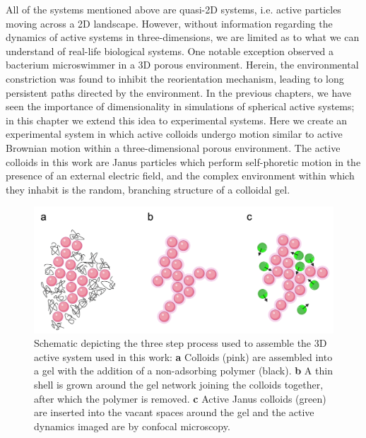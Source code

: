  
 All of the systems mentioned above are quasi-2D systems, i.e. active particles  moving across a 2D landscape. However, without information regarding the dynamics of active systems in three-dimensions, we are limited as to what we can understand of real-life biological systems. One notable exception \cite{bhattacharjee2019} observed a bacterium microswimmer in a 3D porous environment. Herein, the environmental constriction was found to inhibit the reorientation mechanism, leading to long persistent paths directed by the environment. 
In the previous chapters, we have seen the importance of dimensionality in simulations of spherical active systems; in this chapter we extend this idea to experimental systems. Here we create an experimental system in which active colloids undergo motion similar to active Brownian motion within a three-dimensional porous environment. The active colloids in this work are Janus particles which perform self-phoretic motion in the presence of an external electric field, and the complex environment within which they inhabit is the random, branching structure of a colloidal gel. 

\begin{figure}
	\centering
	\includegraphics[width=\linewidth]{figsExpSystem/figSummary}
	\caption[Schematic depicting the three step process used to assemble the experimental 3D active system]{Schematic depicting the three step process used to assemble the 3D active system used in this work: \textbf{a} Colloids (pink) are assembled into a gel with the addition of a non-adsorbing polymer (black). \textbf{b} A thin shell is grown around the gel network joining the colloids together, after which the polymer is removed. \textbf{c} Active Janus colloids (green)  are inserted into the vacant spaces around the gel and the active dynamics imaged are by confocal microscopy. }
	\label{fig:ExpSummary}
\end{figure}


